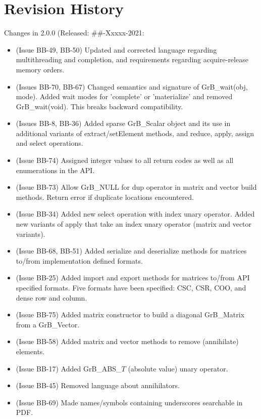\chapter{Revision History}
\label{Chp:RevHistory}

Changes in 2.0.0 (Released: \#\#-Xxxxx-2021:
\begin{itemize}
\item (Issue BB-49, BB-50) Updated and corrected language regarding multithreading and completion, and requirements regarding acquire-release memory orders.
\item (Issues BB-70, BB-67) Changed semantics and signature of {\sf GrB\_wait(obj, mode)}. Added wait modes for 'complete' or 'materialize' and removed {\sf GrB\_wait(void)}. {\color{red} This breaks backward compatibility.}  
\item (Issues BB-8, BB-36) Added sparse {\sf GrB\_Scalar} object and its use in additional variants of extract/setElement methods, and reduce, apply, assign and select operations.
\item (Issue BB-74) Assigned integer values to all return codes as well as all enumerations in the API.
\item (Issue BB-73) Allow {\sf GrB\_NULL} for dup operator in matrix and vector {\sf build} methods.  Return error if duplicate locations encountered.
\item (Issue BB-34) Added new select operation with index unary operator. Added new variants of apply that take an index unary operator (matrix and vector variants).
\item (Issue BB-68, BB-51) Added serialize and deserialize methods for matrices to/from implementation defined formats.
\item (Issue BB-25) Added import and export methods for matrices to/from API specified formats.  Five formats have been specified: CSC, CSR, COO, and dense row and column.
\item (Issue BB-75) Added matrix constructor to build a diagonal {\sf GrB\_Matrix} from a {\sf GrB\_Vector}.
\item (Issue BB-58) Added matrix and vector methods to remove (annihilate) elements.
\item (Issue BB-17) Added {\sf GrB\_ABS\_$T$} (absolute value) unary operator.
\item (Issue BB-45) Removed language about annihilators.
\item (Issue BB-69) Made names/symbols containing underscores searchable in PDF.

\end{itemize}
